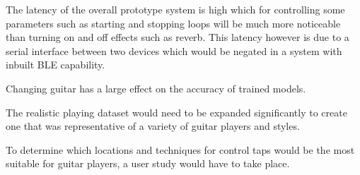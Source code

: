 \documentclass[conference]{IEEEtran}
\begin{document}
The latency of the overall prototype system is high which for controlling some parameters such as starting and stopping loops will be much more noticeable than turning on and off effects such as reverb. This latency however is due to a serial interface between two devices which would be 
negated in a system with inbuilt BLE capability.

Changing guitar has a large effect on the accuracy of trained models.

The realistic playing dataset would need to be expanded significantly to create one that was representative of a variety of guitar players and styles.

To determine which locations and techniques for control taps would be the most suitable for guitar players, a user study would have to take place.
\end{document}
